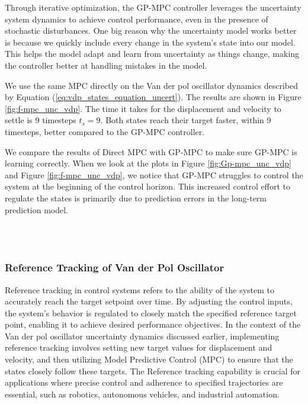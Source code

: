 Through iterative optimization, the GP-MPC controller leverages the uncertainty system dynamics to achieve control performance, even in the presence of stochastic disturbances. One big reason why the uncertainty model works better is because we quickly include every change in the system's state into our model. This helps the model adapt and learn from uncertainty as things change, making the controller better at handling mistakes in the model.

We use the same MPC directly on the Van der pol oscillator dynamics described by Equation (\ref{eq:vdp_states_equation_uncert}). The results are shown in Figure \ref{fig:f-mpc_unc_vdp}. The time it takes for the displacement and velocity to settle is 9 timesteps $t_s=9$. Both states reach their target faster, within 9 timesteps, better compared to the GP-MPC controller.

We compare the results of Direct MPC with GP-MPC to make sure GP-MPC is learning correctly. When we look at the plots in Figure \ref{fig:Gp-mpc_unc_vdp} and Figure \ref{fig:f-mpc_unc_vdp}, we notice that GP-MPC struggles to control the system at the beginning of the control horizon. This increased control effort to regulate the states is primarily due to prediction errors in the long-term prediction model.


\\
\qquad
\\


\subsubsection{Reference Tracking of Van der Pol Oscillator}

Reference tracking in control systems refers to the ability of the system to accurately reach the target setpoint over time. By adjusting the control inputs, the system's behavior is regulated to closely match the specified reference target point, enabling it to achieve desired performance objectives. In the context of the Van der pol oscillator uncertainty dynamics discussed earlier, implementing reference tracking involves setting new target values for displacement and velocity, and then utilizing Model Predictive Control (MPC) to ensure that the states closely follow these targets. The Reference tracking capability is crucial for applications where precise control and adherence to specified trajectories are essential, such as robotics, autonomous vehicles, and industrial automation.

